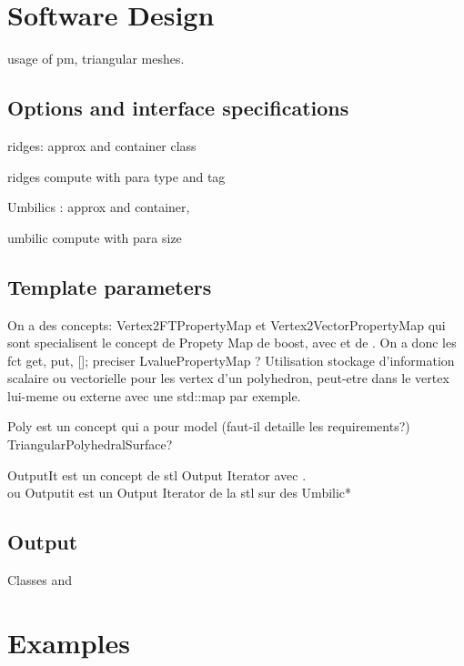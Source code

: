 \section{Software Design}

usage of pm, triangular meshes.

\subsection{Options and interface specifications}
ridges: approx and container class

ridges compute with para type and tag

Umbilics : approx and container, 

umbilic compute with para 
size

\subsection{Template parameters}

On a des concepts: Vertex2FTPropertyMap et Vertex2VectorPropertyMap
qui sont specialisent le concept de Propety Map de boost, avec
 et de . On a donc les fct get,
put, []; preciser LvaluePropertyMap ? Utilisation stockage
d'information scalaire ou vectorielle pour les vertex d'un polyhedron,
peut-etre dans le vertex lui-meme ou externe avec une std::map par
exemple. 

Poly est un concept qui a pour model  (faut-il
detaille les requirements?) TriangularPolyhedralSurface?

OutputIt est un concept de stl Output Iterator avec  .\\
ou Outputit est un Output Iterator de la stl sur des Umbilic*


\subsection{Output}

Classes  and 

\section{Examples} 
